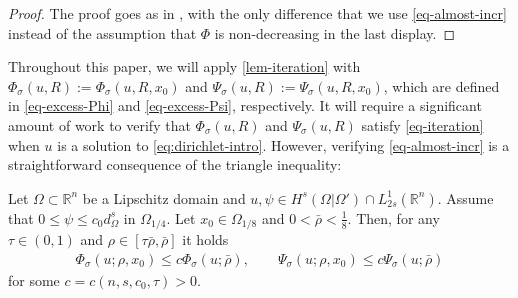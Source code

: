 \documentclass[11pt,reqno]{amsart}
\theoremstyle{plain}
\theoremstyle{definition}
\numberwithin{equation}{section}
\newcommand{\R}{\mathbb{R}}
\newcommand{\1}{\mathbbm{1}}
\begin{document}
\begin{proof}
The proof goes as in \cite[Lemma~5.13]{GiMa12}, with the only difference that we use \eqref{eq-almost-incr} instead of the assumption that $\Phi$ is non-decreasing in the last display.
\end{proof}

Throughout this paper, we will apply \autoref{lem-iteration} with $\Phi_{\sigma}(u,R):=\Phi_{\sigma}(u,R,x_0)$ and $\Psi_{\sigma}(u,R):=\Psi_{\sigma}(u,R,x_0)$, which are defined in \eqref{eq-excess-Phi} and \eqref{eq-excess-Psi}, respectively. It will require a significant amount of work to verify that $\Phi_{\sigma}(u,R)$ and $\Psi_{\sigma}(u,R)$ satisfy \eqref{eq-iteration} when $u$ is a solution to \eqref{eq:dirichlet-intro}. However, verifying \eqref{eq-almost-incr} is a straightforward consequence of the triangle inequality:

\begin{lemma}
    Let $\Omega \subset \R^n$ be a Lipschitz domain and $u, \psi \in H^s(\Omega | \Omega') \cap L^1_{2s}(\R^n)$. Assume that $0 \le \psi \le c_0 d_{\Omega}^s$ in $\Omega_{1/4}$. Let $x_0 \in \Omega_{1/8}$ and $0 < \bar{\rho} < \frac{1}{8}$. Then, for any $\tau \in (0,1)$ and $\rho \in [\tau \bar{\rho} , \bar{\rho}]$ it holds
    \begin{align*}
        \Phi_{\sigma}(u; \rho, x_0) \le c \Phi_{\sigma}(u; \bar{\rho}), \qquad \Psi_{\sigma}(u; \rho, x_0) \le c \Psi_{\sigma}(u; \bar{\rho})
    \end{align*}
    for some $c=c(n,s,c_0,\tau) > 0$.
\end{lemma}
\end{document}
